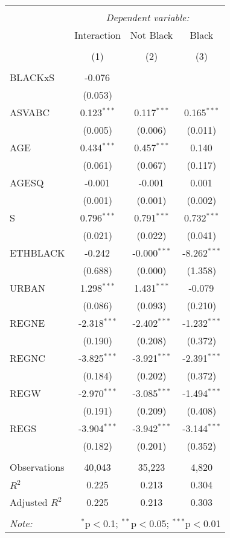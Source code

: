\begin{table}[!htbp] \centering
\begin{tabular}{@{\extracolsep{5pt}}lccc}
\\[-1.8ex]\hline
\hline \\[-1.8ex]
& \multicolumn{3}{c}{\textit{Dependent variable:}} \
\cr \cline{3-4}
\\[-1.8ex] & \multicolumn{1}{c}{Interaction} & \multicolumn{1}{c}{Not Black} & \multicolumn{1}{c}{Black}  \\
\\[-1.8ex] & (1) & (2) & (3) \\
\hline \\[-1.8ex]
 BLACKxS & -0.076$^{}$ & & \\
  & (0.053) & & \\
 ASVABC & 0.123$^{***}$ & 0.117$^{***}$ & 0.165$^{***}$ \\
  & (0.005) & (0.006) & (0.011) \\
 AGE & 0.434$^{***}$ & 0.457$^{***}$ & 0.140$^{}$ \\
  & (0.061) & (0.067) & (0.117) \\
 AGESQ & -0.001$^{}$ & -0.001$^{}$ & 0.001$^{}$ \\
  & (0.001) & (0.001) & (0.002) \\
 S & 0.796$^{***}$ & 0.791$^{***}$ & 0.732$^{***}$ \\
  & (0.021) & (0.022) & (0.041) \\
 ETHBLACK & -0.242$^{}$ & -0.000$^{***}$ & -8.262$^{***}$ \\
  & (0.688) & (0.000) & (1.358) \\
 URBAN & 1.298$^{***}$ & 1.431$^{***}$ & -0.079$^{}$ \\
  & (0.086) & (0.093) & (0.210) \\
 REGNE & -2.318$^{***}$ & -2.402$^{***}$ & -1.232$^{***}$ \\
  & (0.190) & (0.208) & (0.372) \\
 REGNC & -3.825$^{***}$ & -3.921$^{***}$ & -2.391$^{***}$ \\
  & (0.184) & (0.202) & (0.372) \\
 REGW & -2.970$^{***}$ & -3.085$^{***}$ & -1.494$^{***}$ \\
  & (0.191) & (0.209) & (0.408) \\
 REGS & -3.904$^{***}$ & -3.942$^{***}$ & -3.144$^{***}$ \\
  & (0.182) & (0.201) & (0.352) \\
\hline \\[-1.8ex]
 Observations & 40,043 & 35,223 & 4,820 \\
 $R^2$ & 0.225 & 0.213 & 0.304 \\
 Adjusted $R^2$ & 0.225 & 0.213 & 0.303 \\
\hline
\hline \\[-1.8ex]
\textit{Note:} & \multicolumn{3}{r}{$^{*}$p$<$0.1; $^{**}$p$<$0.05; $^{***}$p$<$0.01} \\
\end{tabular}
\end{table}